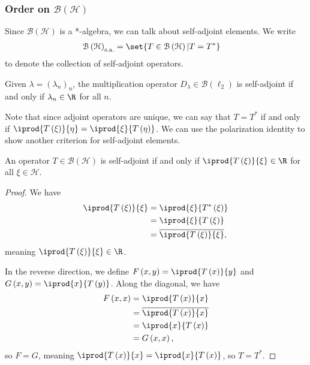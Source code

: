 \documentclass[10pt]{mypackage}
\newcommand{\sa}{\text{s.a.}}
\begin{document}
\subsubsection{Order on $\mathcal{B}\left(\mathcal{H}\right)$}%
Since $\mathcal{B}\left(\mathcal{H}\right)$ is a *-algebra, we can talk about self-adjoint elements. We write
\begin{align*}
  \mathcal{B}\left(\mathcal{H}\right)_{\sa} &= \set{T\in \mathcal{B}\left(\mathcal{H}\right)|T = T^{\ast}}
\end{align*}
to denote the collection of self-adjoint operators.
\begin{example}
  Given $\lambda = \left(\lambda_n\right)_n$, the multiplication operator $D_{\lambda}\in \mathcal{B}\left(\ell_2\right)$ is self-adjoint if and only if $\lambda_n\in \R$ for all $n$.
\end{example}
Note that since adjoint operators are unique, we can say that $T = T^{\ast}$ if and only if $ \iprod{T\left(\xi\right)}{\eta} = \iprod{\xi}{T\left(\eta\right)} $. We can use the polarization identity to show another criterion for self-adjoint elements.
\begin{lemma}
  An operator $T\in \mathcal{B}\left(\mathcal{H}\right)$ is self-adjoint if and only if $ \iprod{T\left(\xi\right)}{\xi}\in \R $ for all $\xi\in \mathcal{H}$.
\end{lemma}
\begin{proof}\hfill
  We have
  \begin{align*}
    \iprod{T\left(\xi\right)}{\xi} &= \iprod{\xi}{T^{\ast}\left(\xi\right)}\\
                                   &= \iprod{\xi}{T\left(\xi\right)}\\
                                   &= \overline{ \iprod{T\left(\xi\right)}{\xi} },
  \end{align*}
  meaning $ \iprod{T\left(\xi\right)}{\xi}\in \R $.\newline

  In the reverse direction, we define $F\left(x,y\right) = \iprod{T\left(x\right)}{y}$ and $ G\left(x,y\right) = \iprod{x}{T\left(y\right)} $. Along the diagonal, we have
  \begin{align*}
    F\left(x,x\right) &= \iprod{T\left(x\right)}{x}\\
                      &= \overline{ \iprod{T\left(x\right)}{x} }\\
                      &= \iprod{x}{T\left(x\right)}\\
                      &= G\left(x,x\right),
  \end{align*}
  so $F = G$, meaning $ \iprod{T\left(x\right)}{x} = \iprod{x}{T\left(x\right)} $, so $T = T^{\ast}$.
\end{proof}
\end{document}
